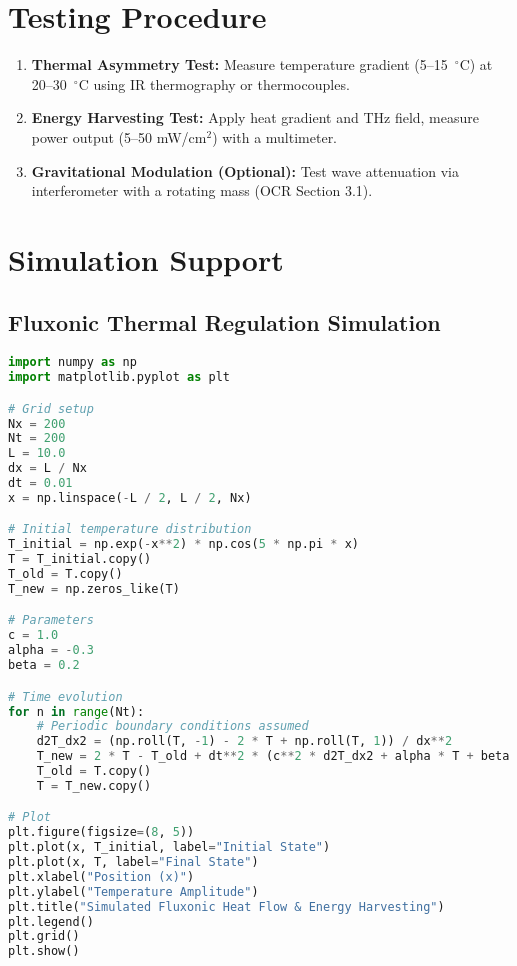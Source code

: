 \documentclass[a4paper,12pt]{article}
\begin{document}
\section{Testing Procedure}
\begin{enumerate}
    \item \textbf{Thermal Asymmetry Test:} Measure temperature gradient (5--15~$^\circ$C) at 20--30~$^\circ$C using IR thermography or thermocouples.
    \item \textbf{Energy Harvesting Test:} Apply heat gradient and THz field, measure power output (5--50 mW/cm$^2$) with a multimeter.
    \item \textbf{Gravitational Modulation (Optional):} Test wave attenuation via interferometer with a rotating mass (OCR Section 3.1).
\end{enumerate}

\section{Simulation Support}
\subsection{Fluxonic Thermal Regulation Simulation}
\begin{lstlisting}[language=Python, caption=Fluxonic Thermal Regulation Simulation, label=lst:thermal]
import numpy as np
import matplotlib.pyplot as plt

# Grid setup
Nx = 200
Nt = 200
L = 10.0
dx = L / Nx
dt = 0.01
x = np.linspace(-L / 2, L / 2, Nx)

# Initial temperature distribution
T_initial = np.exp(-x**2) * np.cos(5 * np.pi * x)
T = T_initial.copy()
T_old = T.copy()
T_new = np.zeros_like(T)

# Parameters
c = 1.0
alpha = -0.3
beta = 0.2

# Time evolution
for n in range(Nt):
    # Periodic boundary conditions assumed
    d2T_dx2 = (np.roll(T, -1) - 2 * T + np.roll(T, 1)) / dx**2
    T_new = 2 * T - T_old + dt**2 * (c**2 * d2T_dx2 + alpha * T + beta * T**3)
    T_old = T.copy()
    T = T_new.copy()

# Plot
plt.figure(figsize=(8, 5))
plt.plot(x, T_initial, label="Initial State")
plt.plot(x, T, label="Final State")
plt.xlabel("Position (x)")
plt.ylabel("Temperature Amplitude")
plt.title("Simulated Fluxonic Heat Flow & Energy Harvesting")
plt.legend()
plt.grid()
plt.show()
\end{lstlisting}
\end{document}
